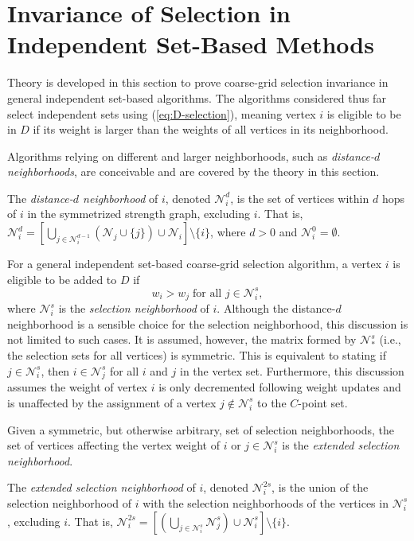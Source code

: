 \documentclass{elsart}
\begin{document}
\section{Invariance of Selection in Independent Set-Based Methods}
\label{sec:invariance}

Theory is developed in this section to prove coarse-grid selection
invariance in general independent set-based algorithms. The algorithms
considered thus far select independent sets using
(\ref{eq:D-selection}), meaning vertex $i$ is eligible to be in $D$ if
its weight is larger than the weights of all vertices in its
neighborhood.

Algorithms relying on different and larger neighborhoods, such as
\emph{distance-$d$ neighborhoods}, are conceivable and are covered by
the theory in this section.
\begin{defn}
The \emph{distance-$d$ neighborhood} of $i$, denoted
$\mathcal{N}_i^d$, is the set of vertices within $d$ hops of $i$ in
the symmetrized strength graph, excluding $i$. That is,
$\mathcal{N}_i^d = \left[\bigcup_{j \in
\mathcal{N}_i^{d-1}}\left(\mathcal{N}_j \cup \{j\}\right)\cup
\mathcal{N}_i\right] \setminus \{i\}$, where $d > 0$ and
$\mathcal{N}_i^0 = \emptyset$.
\end{defn}

For a general independent set-based coarse-grid selection algorithm, a
vertex $i$ is eligible to be added to $D$ if
\begin{equation}
\label{eqn:general-selection}
w_i > w_j\;\textrm{for all } j \in \mathcal{N}_i^s,
\end{equation}
where $\mathcal{N}_i^s$ is the \emph{selection neighborhood} of
$i$. Although the distance-$d$ neighborhood is a sensible choice for
the selection neighborhood, this discussion is not limited to such
cases. It is assumed, however, the matrix formed by $\mathcal{N}_*^s$
(i.e., the selection sets for all vertices) is symmetric. This is
equivalent to stating if $j \in \mathcal{N}_i^s$, then $i \in
\mathcal{N}_j^s$ for all $i$ and $j$ in the vertex set. Furthermore,
this discussion assumes the weight of vertex $i$ is only decremented
following weight updates and is unaffected by the assignment of a
vertex $j \notin \mathcal{N}_i^s$ to the $C$-point set.

Given a symmetric, but otherwise arbitrary, set of selection
neighborhoods, the set of vertices affecting the
vertex weight of $i$ or $j \in \mathcal{N}_i^s$ is the \emph{extended
selection neighborhood}.
\begin{defn}
The \emph{extended selection neighborhood} of $i$, denoted
$\mathcal{N}_i^{2s}$, is the union of the selection neighborhood of
$i$ with the selection neighborhoods of the vertices in
$\mathcal{N}_i^s$, excluding $i$. That is, $\mathcal{N}_i^{2s} =
\left[\left(\bigcup_{j \in \mathcal{N}_i^s}\mathcal{N}_j^s\right)\cup
\mathcal{N}_i^s\right] \setminus \{i\}$.
\end{defn}
\end{document}
